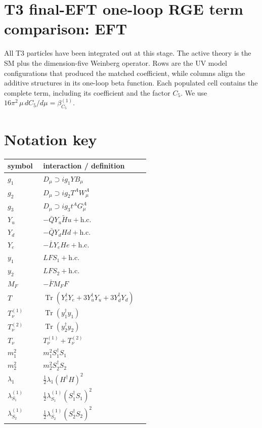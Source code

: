 \documentclass[8pt]{article}
\begin{document}
\begin{landscape}
\section*{T3 final-EFT one-loop RGE term comparison: EFT}
All T3 particles have been integrated out at this stage. The active theory is the SM plus the dimension-five Weinberg operator. Rows are the UV model configurations that produced the matched coefficient, while columns align the additive structures in its one-loop beta function. Each populated cell contains the complete term, including its coefficient and the factor $C_5$.
\medskip
We use $16\pi^2\,\mu\,dC_5/d\mu=\beta_{C_5}^{(1)}$.
\section*{Notation key}
\begin{longtable}{@{}p{0.23\linewidth}p{0.69\linewidth}@{}}
\toprule
symbol & interaction / definition \\
\midrule
$g_1$ & $D_\mu\supset i g_1YB_\mu$ \\
$g_2$ & $D_\mu\supset i g_2T^AW_\mu^A$ \\
$g_3$ & $D_\mu\supset i g_3t^AG_\mu^A$ \\
$Y_u$ & $-\bar QY_u\widetilde Hu+\mathrm{h.c.}$ \\
$Y_d$ & $-\bar QY_dHd+\mathrm{h.c.}$ \\
$Y_e$ & $-\bar LY_eHe+\mathrm{h.c.}$ \\
$y_1$ & $LFS_1+\mathrm{h.c.}$ \\
$y_2$ & $LFS_2+\mathrm{h.c.}$ \\
$M_F$ & $-\bar FM_FF$ \\
$T$ & $\operatorname{Tr}(Y_e^\dagger Y_e+3Y_u^\dagger Y_u+3Y_d^\dagger Y_d)$ \\
$T_\nu^{(1)}$ & $\operatorname{Tr}(y_1^\dagger y_1)$ \\
$T_\nu^{(2)}$ & $\operatorname{Tr}(y_2^\dagger y_2)$ \\
$T_\nu$ & $T_\nu^{(1)}+T_\nu^{(2)}$ \\
$m_1^2$ & $m_1^2S_1^\dagger S_1$ \\
$m_2^2$ & $m_2^2S_2^\dagger S_2$ \\
$\lambda_1$ & $\frac12\lambda_1(H^\dagger H)^2$ \\
$\lambda_{S_1}^{(1)}$ & $\frac12\lambda_{S_1}^{(1)}(S_1^\dagger S_1)^2$ \\
$\lambda_{S_2}^{(1)}$ & $\frac12\lambda_{S_2}^{(1)}(S_2^\dagger S_2)^2$ \\

\end{longtable}
\end{landscape}
\end{document}
